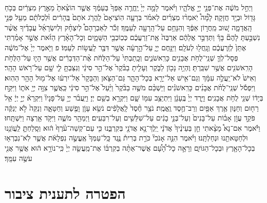 \documentclass[twoside, openany, parskip=half, 11pt]{book}
\begin{document}
\begin{footnotesize}
 
 \begin{multicols}{2}
 \\
וַיְחַ֣ל מֹשֶׁ֔ה אֶת־פְּנֵ֖י יְיָ֣ אֱלֹהָ֑יו וַיֹּ֗אמֶר לָמָ֤ה יְיָ֙ יֶֽחֱרֶ֤ה אַפְּךָ֙ בְּעַמֶּ֔ךָ אֲשֶׁ֤ר הוֹצֵ֨אתָ֙ מֵאֶ֣רֶץ מִצְרַ֔יִם בְּכֹ֥חַ גָּד֖וֹל וּבְיָ֥ד חֲזָקָֽה׃ לָ֩מָּה֩ יֹֽאמְר֨וּ מִצְרַ֜יִם לֵאמֹ֗ר בְּרָעָ֤ה הֽוֹצִיאָם֙ לַֽהֲרֹ֤ג אֹתָם֙ בֶּֽהָרִ֔ים וּ֨לְכַלֹּתָ֔ם מֵעַ֖ל פְּנֵ֣י הָֽאֲדָמָ֑ה שׁ֚וּב מֵֽחֲר֣וֹן אַפֶּ֔ךָ וְהִנָּחֵ֥ם עַל־הָֽרָעָ֖ה לְעַמֶּֽךָ׃ זְכֹ֡ר לְאַבְרָהָם֩ לְיִצְחָ֨ק וּֽלְיִשְׂרָאֵ֜ל עֲבָדֶ֗יךָ אֲשֶׁ֨ר נִשְׁבַּ֣עְתָּ לָהֶם֘ בָּךְ֒ וַתְּדַבֵּ֣ר אֲלֵהֶ֔ם אַרְבֶּה֙ אֶֽת־זַרְעֲכֶ֔ם כְּכֽוֹכְבֵ֖י הַשָּׁמָ֑יִם וְכָל־הָאָ֨רֶץ הַזֹּ֜את אֲשֶׁ֣ר אָמַ֗רְתִּי אֶתֵּן֙ לְזַֽרְעֲכֶ֔ם וְנָֽחֲל֖וּ לְעֹלָֽם׃ וַיִּנָּ֖חֶם יְיָ֑ עַל־הָ֣רָעָ֔ה אֲשֶׁ֥ר דִּבֶּ֖ר לַֽעֲשׂ֥וֹת לְעַמּֽוֹ׃ פ
 וַיֹּ֤אמֶר יְיָ֙ אֶל־מֹשֶׁ֔ה פְּסָל־לְךָ֛ שְׁנֵֽי־לֻחֹ֥ת אֲבָנִ֖ים כָּרִֽאשֹׁנִ֑ים וְכָֽתַבְתִּי֙ עַל־הַלֻּחֹ֔ת אֶ֨ת־הַדְּבָרִ֔ים אֲשֶׁ֥ר הָי֛וּ עַל־הַלֻּחֹ֥ת הָרִֽאשֹׁנִ֖ים אֲשֶׁ֥ר שִׁבַּֽרְתָּ׃ וֶהְיֵ֥ה נָכ֖וֹן לַבֹּ֑קֶר וְעָלִ֤יתָ בַבֹּ֨קֶר֙ אֶל־הַ֣ר סִינַ֔י וְנִצַּבְתָּ֥ לִ֛י שָׁ֖ם עַל־רֹ֥אשׁ הָהָֽר׃ וְאִישׁ֙ לֹא־יַֽעֲלֶ֣ה עִמָּ֔ךְ וְגַם־אִ֥ישׁ אַל־יֵרָ֖א בְּכָל־הָהָ֑ר גַּם־הַצֹּ֤אן וְהַבָּקָר֙ אַל־יִרְע֔וּ אֶל־מ֖וּל הָהָ֥ר הַהֽוּא׃ 
 וַיִּפְסֹ֡ל שְׁנֵֽי־לֻחֹ֨ת אֲבָנִ֜ים כָּרִֽאשֹׁנִ֗ים וַיַּשְׁכֵּ֨ם מֹשֶׁ֤ה בַבֹּ֨קֶר֙ וַיַּ֨עַל֙ אֶל־הַ֣ר סִינַ֔י כַּֽאֲשֶׁ֛ר צִוָּ֥ה יְיָ֖ אֹת֑וֹ וַיִּקַּ֣ח בְּיָד֔וֹ שְׁנֵ֖י לֻחֹ֥ת אֲבָנִֽים׃ וַיֵּ֤רֶד יְיָ֙ בֶּֽעָנָ֔ן וַיִּתְיַצֵּ֥ב עִמּ֖וֹ שָׁ֑ם וַיִּקְרָ֥א בְשֵׁ֖ם יְיָ׃ וַיַּֽעֲבֹ֨ר יְיָ֥ עַל־פָּנָיו֘ וַיִּקְרָא֒ יְיָ֣ יְיָ֔ אֵ֥ל רַח֖וּם וְחַנּ֑וּן אֶ֥רֶךְ אַפַּ֖יִם וְרַב־חֶ֥סֶד וֶֽאֱמֶֽת׃ נֹצֵ֥ר חֶ֨סֶד֙ לָֽאֲלָפִ֔ים נֹשֵׂ֥א עָוֹ֛ן וָפֶ֖שַׁע וְחַטָּאָ֑ה וְנַקֵּה֙ לֹ֣א יְנַקֶּ֔ה פֹּקֵ֣ד עֲוֹ֣ן אָב֗וֹת עַל־בָּנִים֙ וְעַל־בְּנֵ֣י בָנִ֔ים עַל־שִׁלֵּשִׁ֖ים וְעַל־רִבֵּעִֽים׃ וַיְמַהֵ֖ר מֹשֶׁ֑ה וַיִּקֹּ֥ד אַ֖רְצָה וַיִּשְׁתָּֽחוּ׃ וַיֹּ֡אמֶר אִם־נָא֩ מָצָ֨אתִי חֵ֤ן בְּעֵינֶ֨יךָ֙ אֲדֹנָ֔י יֵֽלֶךְ־נָ֥א אֲדֹנָ֖י בְּקִרְבֵּ֑נוּ כִּ֤י עַם־קְשֵׁה־עֹ֨רֶף֙ ה֔וּא וְסָֽלַחְתָּ֛ לַֽעֲוֹנֵ֥נוּ וּלְחַטָּאתֵ֖נוּ וּנְחַלְתָּֽנוּ׃ וַיֹּ֗אמֶר הִנֵּ֣ה אָנֹכִי֘ כֹּרֵ֣ת בְּרִית֒ נֶ֤גֶד כָּֽל־עַמְּךָ֙ אֶֽעֱשֶׂ֣ה נִפְלָאֹ֔ת אֲשֶׁ֛ר לֹֽא־נִבְרְא֥וּ בְכָל־הָאָ֖רֶץ וּבְכָל־הַגּוֹיִ֑ם וְרָאָ֣ה כָל־הָ֠עָ֠ם אֲשֶׁר־אַתָּ֨ה בְקִרְבּ֜וֹ אֶת־מַֽעֲשֵׂ֤ה יְיָ֙ כִּֽי־נוֹרָ֣א ה֔וּא אֲשֶׁ֥ר אֲנִ֖י עֹשֶׂ֥ה עִמָּֽךְ׃
 
\end{multicols} 
 
\section*{הפטרה לתענית ציבור}



\end{footnotesize}
\end{document}
